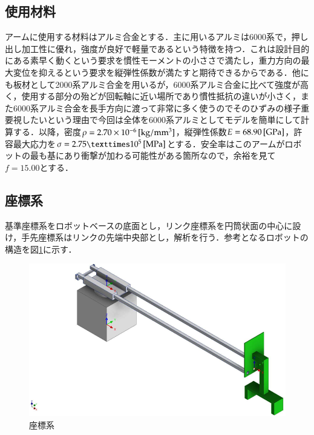 \documentclass[10pt,b5paper,papersize,dvipdfmx]{jsbook}
\begin{document}
\subsection{使用材料}
アームに使用する材料はアルミ合金とする．主に用いるアルミは6000系で，押し出し加工性に優れ，強度が良好で軽量であるという特徴を持つ．これは設計目的にある素早く動くという要求を慣性モーメントの小ささで満たし，重力方向の最大変位を抑えるという要求を縦弾性係数が満たすと期待できるからである．他にも板材として2000系アルミ合金を用いるが，6000系アルミ合金に比べて強度が高く，使用する部分の殆どが回転軸に近い場所であり慣性抵抗の違いが小さく，また6000系アルミ合金を長手方向に渡って非常に多く使うのでそのひずみの様子重要視したいという理由で今回は全体を6000系アルミとしてモデルを簡単にして計算する．以降，密度$\rho=2.70\times 10^{-6}\tani*{kg/mm^3}$，縦弾性係数$E=68.90 \tani*{GPa}$，許容最大応力を$\sigma=2.75×10^{5} \tani*{MPa}$とする．安全率はこのアームがロボットの最も基にあり衝撃が加わる可能性がある箇所なので，余裕を見て$f=15.00$とする．

\subsection{座標系}\label{座標系}
基準座標系をロボットベースの底面とし，リンク座標系を円筒状面の中心に設け，手先座標系はリンクの先端中央部とし，解析を行う．参考となるロボットの構造を図\ref{fig:座標系}に示す．
\begin{figure}[htbp]
  \centering
  \includegraphics[width=.85\textwidth]{img/robot01.png}
  \caption{座標系}
  \label{fig:座標系}
\end{figure}
\end{document}

